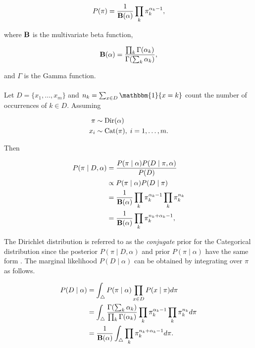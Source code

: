 \documentclass[12pt]{report}
\newcommand{\1}[0]{\mathbbm{1}}
\newcommand{\Cat}[0]{\textnormal{Cat}}
\newcommand{\Dir}[0]{\textnormal{Dir}}
\newcommand{\Bf}[0]{\text{\textbf{B}}}
\begin{document}
\begin{equation}
    P(\pi) = \frac{1}{\Bf(\alpha)} \prod_k \pi_k^{\alpha_k-1}, \label{eq:dir-pdf}
\end{equation}

where $\Bf$ is the multivariate beta function,

\begin{equation}
    \Bf(\alpha) = \frac{\prod_k \Gamma(\alpha_k)}{\Gamma(\sum_k \alpha_k)}, \label{eq:betafunc}
\end{equation}

and $\Gamma$ is the Gamma function.
\\\\
Let $D = \{x_1, \ldots, x_m\}$ and $n_k = \sum_{x \in D} \1\{x = k\}$ count
the number of occurrences of $k \in D$. Assuming

\begin{align*}
    \pi & \sim \Dir(\alpha) \\
    x_i & \sim \Cat(\pi),\; i = 1, \ldots, m.
\end{align*}

Then

\begin{align*}
    P(\pi \mid D, \alpha)
    &= \frac{P(\pi \mid \alpha) P(D \mid \pi, \alpha)}{P(D)} \\
    & \propto P(\pi \mid \alpha) P(D \mid \pi) \\
    &= \frac{1}{\Bf(\alpha)} \prod_k \pi_k^{\alpha_k - 1} \prod_k \pi_k^{n_k} \\
    &= \frac{1}{\Bf(\alpha)} \prod_k \pi_k^{n_k + \alpha_k - 1},
\end{align*}

The Dirichlet distribution is referred to as the \emph{conjugate} prior for the
Categorical distribution since the posterior $P(\pi \mid D, \alpha)$ and prior $P(\pi \mid \alpha)$
have the same form \cite{gelman-bayesian-data-analysis}. The marginal likelihood $P(D \mid \alpha)$
can be obtained by integrating over $\pi$ as follows.

\begin{align}
    P(D \mid \alpha)
    &= \int_{\triangle} P(\pi \mid \alpha)\prod_{x \in D} P(x \mid \pi) d \pi \nonumber \\
    &= \int_{\triangle} \frac{\Gamma(\sum_k \alpha_k)}{\prod_k \Gamma(\alpha_k)}
                        \prod_k \pi^{\alpha_k - 1}_k \prod_k \pi_k^{n_k} d \pi \nonumber \\
    &= \frac{1}{\Bf(\alpha)}
       \int_{\triangle} \prod_k \pi_k^{n_k + \alpha_k - 1} d \pi. \label{eq:unnormed-dir}
\end{align}
\end{document}
